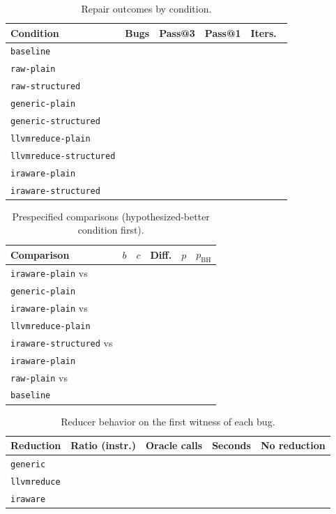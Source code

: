 \documentclass[conference]{IEEEtran}
\newcommand{\cn}[1]{\texttt{#1}}   %
\begin{document}
\begin{table}[t]
\caption{Repair outcomes by condition.}
\label{tab:main}
\centering\footnotesize
\begin{tabular}{@{}lcccc@{}}
\toprule
Condition & Bugs & Pass@3 & Pass@1 & Iters.\ \\
\midrule
\cn{baseline} &  &  &  &  \\
\cn{raw-plain} &  &  &  &  \\
\cn{raw-structured} &  &  &  &  \\
\cn{generic-plain} &  &  &  &  \\
\cn{generic-structured} &  &  &  &  \\
\cn{llvmreduce-plain} &  &  &  &  \\
\cn{llvmreduce-structured} &  &  &  &  \\
\cn{iraware-plain} &  &  &  &  \\
\cn{iraware-structured} &  &  &  &  \\
\bottomrule
\end{tabular}
\end{table}

\begin{table}[t]
\caption{Prespecified comparisons (hypothesized-better condition first).}
\label{tab:tests}
\centering\footnotesize
\setlength{\tabcolsep}{3pt}
\begin{tabular}{@{}p{3.2cm}ccccc@{}}
\toprule
Comparison & $b$ & $c$ & Diff. & $p$ & $p_{\mathrm{BH}}$ \\
\midrule
\cn{iraware-plain} vs \\ \cn{generic-plain} &  &  &  &  &  \\
\cn{iraware-plain} vs \\ \cn{llvmreduce-plain} &  &  &  &  &  \\
\cn{iraware-structured} vs \\ \cn{iraware-plain} &  &  &  &  &  \\
\cn{raw-plain} vs \\ \cn{baseline} &  &  &  &  &  \\
\bottomrule
\end{tabular}
\end{table}

\begin{table}[t]
\caption{Reducer behavior on the first witness of each bug.}
\label{tab:reducers}
\centering\footnotesize
\begin{tabular}{@{}lcccc@{}}
\toprule
Reduction & Ratio (instr.) & Oracle calls & Seconds & No reduction \\
\midrule
\cn{generic} &  &  &  &  \\
\cn{llvmreduce} &  &  &  &  \\
\cn{iraware} &  &  &  &  \\
\bottomrule
\end{tabular}
\end{table}
\end{document}
